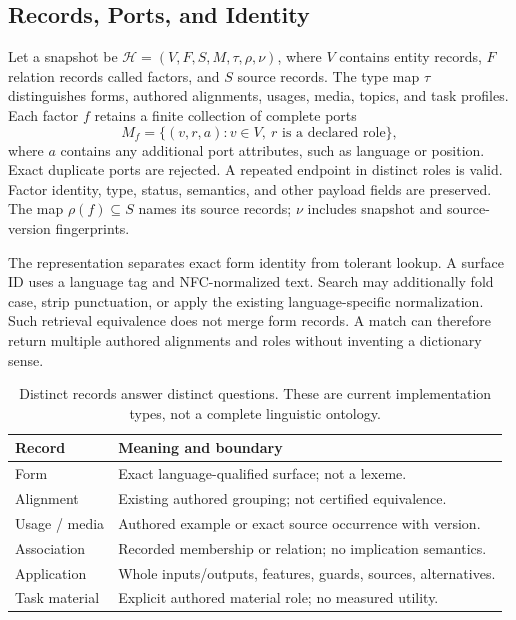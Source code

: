 \documentclass{article}
\begin{document}
\subsection{Records, Ports, and Identity}

Let a snapshot be $\mathcal{H}=(V,F,S,M,\tau,\rho,\nu)$, where $V$ contains entity records, $F$ relation records called factors, and $S$ source records. The type map $\tau$ distinguishes forms, authored alignments, usages, media, topics, and task profiles. Each factor $f$ retains a finite collection of complete ports
\begin{equation}
 M_f=\{(v,r,a):v\in V,\ r\text{ is a declared role}\},
\end{equation}
where $a$ contains any additional port attributes, such as language or position. Exact duplicate ports are rejected. A repeated endpoint in distinct roles is valid. Factor identity, type, status, semantics, and other payload fields are preserved. The map $\rho(f)\subseteq S$ names its source records; $\nu$ includes snapshot and source-version fingerprints.

The representation separates exact form identity from tolerant lookup. A surface ID uses a language tag and NFC-normalized text. Search may additionally fold case, strip punctuation, or apply the existing language-specific normalization. Such retrieval equivalence does not merge form records. A match can therefore return multiple authored alignments and roles without inventing a dictionary sense.

\begin{table}[t]
\caption{Distinct records answer distinct questions. These are current implementation types, not a complete linguistic ontology.}
\label{tab:types}
\centering\small
\begin{tabular}{@{}p{}p{}@{}}
\toprule
Record & Meaning and boundary \\
\midrule
Form & Exact language-qualified surface; not a lexeme. \\
Alignment & Existing authored grouping; not certified equivalence. \\
Usage / media & Authored example or exact source occurrence with version. \\
Association & Recorded membership or relation; no implication semantics. \\
Application & Whole inputs/outputs, features, guards, sources, alternatives. \\
Task material & Explicit authored material role; no measured utility. \\
\bottomrule
\end{tabular}
\end{table}
\end{document}
